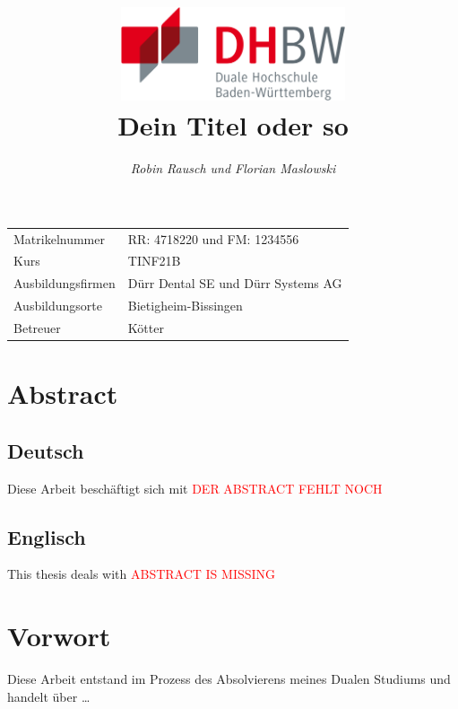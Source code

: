 \documentclass[12pt,a4paper]{article}
\author{\slshape Robin Rausch und Florian Maslowski}
\title{\includegraphics[height=2.75cm]{Bilder/dhbw_logo.png}\vspace{2cm}\\\textbf{Dein Titel oder so}}
\begin{document}
\pagestyle{titlepage}
\clearpage\maketitle
\thispagestyle{empty}
\vspace*{\fill}
\begin{center}
	\begin{tabularx}{\textwidth}{X X}
		Matrikelnummer & RR: 4718220 und FM: 1234556 \\
		Kurs & TINF21B \\
		Ausbildungsfirmen & Dürr Dental SE und Dürr Systems AG \\
		Ausbildungsorte & Bietigheim-Bissingen \\
		Betreuer & Kötter \\
	\end{tabularx}
\end{center}

\newpage
{}

\pagestyle{fancy_transition}
\section*{Abstract}
\subsection*{Deutsch}
Diese Arbeit beschäftigt sich mit \textcolor{red}{DER ABSTRACT FEHLT NOCH}

\subsection*{Englisch}
This thesis deals with \textcolor{red}{ABSTRACT IS MISSING}

\newpage
\section*{Vorwort}
Diese Arbeit entstand im Prozess des Absolvierens meines Dualen Studiums und handelt über \dots

\newpage
\end{document}
